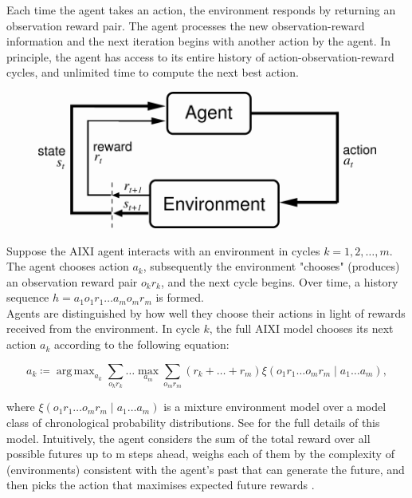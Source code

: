 \documentclass{article}
\theoremstyle{definition}
\newtheorem{primary statistics}[definition]{Primary Statistics}
\newtheorem{auxiliary statistics}[definition]{Auxiliary Statistics}
\DeclareMathOperator*{\argmax}{arg\,max} %
\begin{document}
Each time the agent takes an action, the environment responds by returning an observation reward pair. The agent processes the new observation-reward information and the next iteration begins with another action by the agent. In principle, the agent has access to its entire history of action-observation-reward cycles, and unlimited time to compute the next best action.  \\

\begin{figure}
\includegraphics[width = 12cm]{suttonbarto_rl}
	\caption{\citep{sutton1998reinforcement}}
\end{figure}
 

Suppose the AIXI agent interacts with an environment in cycles $k=1,2, \ldots, m$. The agent chooses action $a_k$, subsequently the environment "chooses" (produces) an observation reward pair $o_kr_k$, and the next cycle begins. Over time, a history sequence $h=a_1o_1r_1 \ldots a_mo_mr_m$ is formed. \\ 

Agents are distinguished by how well they choose their actions in light of rewards received from the environment. In cycle $k$, the full AIXI model chooses its next action $a_k$ according to the following equation:

$$a_k \coloneqq \argmax_{a_k} \sum_{o_kr_k} \ldots \max_{a_m} \sum_{o_mr_m} (r_k+\ldots+r_m) \xi (o_1r_1 \ldots o_mr_m \mid a_1 \ldots a_m), $$

where $\xi (o_1r_1 \ldots o_mr_m \mid a_1 \ldots a_m)$ is a mixture environment model over a model class of chronological probability distributions. See \citep{hutter2005universal} for the full details of this model. Intuitively, the agent considers the sum of the total reward over all possible futures up to m steps ahead, weighs each of them by the complexity of (environments) consistent with the agent’s past that can generate the future, and then picks the action that maximises expected future rewards \citep{veness2011monte}. \\
\end{document}
